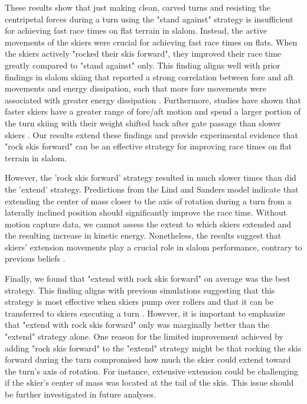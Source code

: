 These results show that just making clean, carved turns and resisting the centripetal forces during a turn using the "stand against" strategy is insufficient for achieving fast race times on flat terrain in slalom. Instead, the active movements of the skiers were crucial for achieving fast race times on flats. When the skiers actively "rocked their skis forward", they improved their race time greatly compared to "stand against" only. This finding aligns well with prior findings in slalom skiing that reported a strong correlation between fore and aft movements and energy dissipation, such that more fore movements were associated with greater energy dissipation \cite{reid_turn_2009, reid_kinematic_2010}. Furthermore, studies have shown that faster skiers have a greater range of fore/aft motion and spend a larger portion of the turn skiing with their weight shifted back after gate passage than slower skiers \cite{tjorhom_beskrivelse_2007, reid_kinematic_2010}. Our results extend these findings and provide experimental evidence that "rock skis forward" can be an effective strategy for improving race times on flat terrain in slalom.

However, the 'rock skis forward' strategy resulted in much slower times than did the 'extend' strategy. Predictions from the Lind and Sanders model \cite{lind_physics_2004} indicate that extending the center of mass closer to the axis of rotation during a turn from a laterally inclined position should significantly improve the race time. Without motion capture data, we cannot assess the extent to which skiers extended and the resulting increase in kinetic energy. Nonetheless, the results suggest that skiers' extension movements play a crucial role in slalom performance, contrary to previous beliefs \cite{supej_differential_2008, supej_doba_2001}.

Finally, we found that "extend with rock skis forward" on average was the best strategy. This finding aligns with previous simulations suggesting that this strategy is most effective when skiers pump over rollers \cite{mote_accelerations_1983} and that it can be transferred to skiers executing a turn \cite{reid_kinematic_2010}. However, it is important to emphasize that "extend with rock skis forward" only was marginally better than the "extend" strategy alone. One reason for the limited improvement achieved by adding "rock skis forward" to the "extend" strategy might be that rocking the skis forward during the turn compromised how much the skier could extend toward the turn's axis of rotation. For instance, extensive extension could be challenging if the skier's center of mass was located at the tail of the skis. This issue should be further investigated in future analyses.

